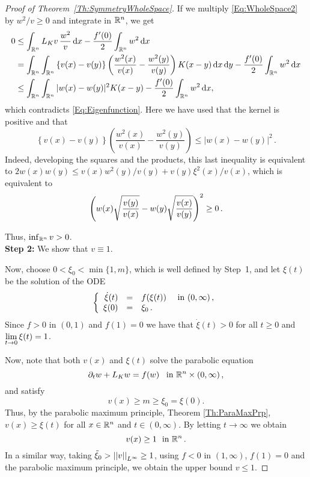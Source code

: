 \begin{proof}[Proof of Theorem~\ref{Th:SymmetryWholeSpace}]
If we multiply \eqref{Eq:WholeSpace2} by $w^2/v\geq 0$ and integrate in $\mathbb{R}^n$, we get
\begin{align*}
0 &\leq \int_{\mathbb{R}^n} L_K v\,\frac{w^2}{v} \,\mathrm{d} x - \frac{f'(0)}{2}\int_{\mathbb{R}^n} w^2 \,\mathrm{d} x \\
&= \int_{\mathbb{R}^n}\int_{\mathbb{R}^n}\left\{ v(x)-v(y) \right\} \left( \frac{w^2(x)}{v(x)}-\frac{w^2(y)}{v(y)} \right) K(x-y) \,\mathrm{d} x \,\mathrm{d} y - \frac{f'(0)}{2}\int_{\mathbb{R}^n} w^2 \,\mathrm{d} x \\
&\leq \int_{\mathbb{R}^n}\int_{\mathbb{R}^n} |w(x)-w(y)|^2 K(x-y) - \frac{f'(0)}{2}\int_{\mathbb{R}^n} w^2 \,\mathrm{d} x ,
\end{align*}
which contradicts \eqref{Eq:Eigenfunction}. Here we have used that the kernel is positive and that
$$
\left\{ v(x)-v(y) \right\} \left( \frac{w^2(x)}{v(x)}-\frac{w^2(y)}{v(y)} \right)  \leq |w (x) - w(y)|^2\,.
$$
Indeed, developing the squares and the products, this last inequality is equivalent to $ 2 w(x) w(y) \leq v(x) w^2(y)/v(y) +  v(y) \xi^2 (x) /v(x)$, which is equivalent to
$$
\left ( {w (x)\sqrt{\dfrac{v(y)}{v(x)}} - w(y) \sqrt{\dfrac{v(x)}{v(y)} } }\right )^2 \geq 0\,.
$$


Thus, $\inf_{\mathbb{R}^n} v >0$.\\

\textbf{Step 2:} We show that $v\equiv 1$.

Now, choose $0<\xi_0<\min\{1,m\}$, which is well defined by Step~1, and let $\xi(t)$ be the solution of the ODE
$$
\left\{\begin{array}{rcll}
\dot{\xi}(t) &=& f(\xi(t)) & \textrm{ in }(0,\infty)\,,\\
\xi(0) &=& \xi_0\,.
\end{array} \right.
$$
Since $f>0$ in $(0,1)$ and $f(1) = 0$ we have that $\dot{\xi}(t)>0$ for all $t\geq 0$ and $\displaystyle \lim_{t\to 0} \xi(t) = 1$.

Now, note that both $v(x)$ and $\xi(t)$ solve the parabolic equation
$$ \partial_t w + L_K w = f(w) \,\,\, \textrm{ in }\mathbb{R}^n\times (0,\infty)\,, $$
and satisfy
$$ v(x) \geq m \geq \xi_0 = \xi(0). $$
Thus, by the parabolic maximum principle, Theorem \ref{Th:ParaMaxPrp}, $v(x)\geq \xi(t)$ for all $x\in\mathbb{R}^n$ and $t\in(0,\infty)$. By letting $t \to \infty$ we obtain
$$ v(x) \geq 1 \,\, \textrm{ in }\mathbb{R}^n\,.  $$
In a similar way, taking $\tilde{\xi}_0>\left | \left |{v} \right | \right |_{L^\infty} \geq 1$, using $f<0$ in $(1,\infty)$, $f(1)=0$ and the parabolic maximum principle, we obtain the upper bound $v\leq 1$.

\end{proof}



